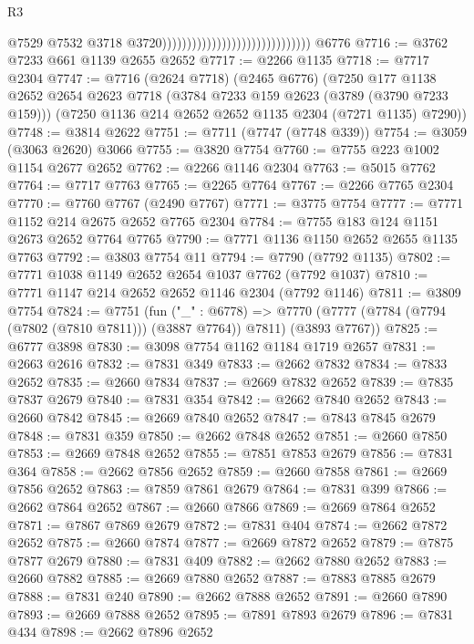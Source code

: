 \begin{lexlean}{R3}
\begin{coremodule}
                                                                @7529
                                                                @7532
                                                                @3718
                                                                @3720))))))))))))))))))))))))))))))
    @6776
@7716 := @3762 @7233 @661 @1139 @2655 @2652
@7717 := @2266 @1135
@7718 := @7717 @2304
@7747 := @7716
    (@2624 @7718)
    (@2465 @6776)
    (@7250
      @177
      @1138
      @2652
      @2654
      @2623
      @7718
      (@3784 @7233 @159 @2623 (@3789 (@3790 @7233 @159)))
      (@7250 @1136 @214 @2652 @2652 @1135 @2304 (@7271 @1135) @7290))
@7748 := @3814 @2622
@7751 := @7711 (@7747 (@7748 @339))
@7754 := @3059 (@3063 @2620) @3066
@7755 := @3820 @7754
@7760 := @7755 @223 @1002 @1154 @2677 @2652
@7762 := @2266 @1146 @2304
@7763 := @5015 @7762
@7764 := @7717 @7763
@7765 := @2265 @7764
@7767 := @2266 @7765 @2304
@7770 := @7760 @7767 (@2490 @7767)
@7771 := @3775 @7754
@7777 := @7771 @1152 @214 @2675 @2652 @7765 @2304
@7784 := @7755 @183 @124 @1151 @2673 @2652 @7764 @7765
@7790 := @7771 @1136 @1150 @2652 @2655 @1135 @7763
@7792 := @3803 @7754 @11
@7794 := @7790 (@7792 @1135)
@7802 := @7771 @1038 @1149 @2652 @2654 @1037 @7762 (@7792 @1037)
@7810 := @7771 @1147 @214 @2652 @2652 @1146 @2304 (@7792 @1146)
@7811 := @3809 @7754
@7824 := @7751
    (fun ("_" : @6778) =>
    @7770 (@7777 (@7784 (@7794 (@7802 (@7810 @7811))) (@3887 @7764)) @7811) (@3893 @7767))
@7825 := @6777 @3898
@7830 := @3098 @7754 @1162 @1184 @1719 @2657
@7831 := @2663 @2616
@7832 := @7831 @349
@7833 := @2662 @7832
@7834 := @7833 @2652
@7835 := @2660 @7834
@7837 := @2669 @7832 @2652
@7839 := @7835 @7837 @2679
@7840 := @7831 @354
@7842 := @2662 @7840 @2652
@7843 := @2660 @7842
@7845 := @2669 @7840 @2652
@7847 := @7843 @7845 @2679
@7848 := @7831 @359
@7850 := @2662 @7848 @2652
@7851 := @2660 @7850
@7853 := @2669 @7848 @2652
@7855 := @7851 @7853 @2679
@7856 := @7831 @364
@7858 := @2662 @7856 @2652
@7859 := @2660 @7858
@7861 := @2669 @7856 @2652
@7863 := @7859 @7861 @2679
@7864 := @7831 @399
@7866 := @2662 @7864 @2652
@7867 := @2660 @7866
@7869 := @2669 @7864 @2652
@7871 := @7867 @7869 @2679
@7872 := @7831 @404
@7874 := @2662 @7872 @2652
@7875 := @2660 @7874
@7877 := @2669 @7872 @2652
@7879 := @7875 @7877 @2679
@7880 := @7831 @409
@7882 := @2662 @7880 @2652
@7883 := @2660 @7882
@7885 := @2669 @7880 @2652
@7887 := @7883 @7885 @2679
@7888 := @7831 @240
@7890 := @2662 @7888 @2652
@7891 := @2660 @7890
@7893 := @2669 @7888 @2652
@7895 := @7891 @7893 @2679
@7896 := @7831 @434
@7898 := @2662 @7896 @2652

\end{coremodule}
\end{lexlean}
